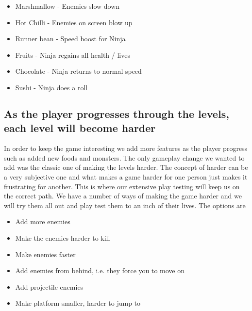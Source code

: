 \documentclass{article}
\begin{document}
\begin{itemize}
\item Marshmallow - Enemies slow down
\item Hot Chilli - Enemies on screen blow up
\item Runner bean - Speed boost for Ninja
\item Fruits - Ninja regains all health / lives
\item Chocolate - Ninja returns to normal speed
\item Sushi - Ninja does a roll
\end{itemize}

\subsection{ As the player progresses through the levels, each level will become harder }
In order to keep the game interesting we add more features as the player progress such as added new foods and monsters. 
The only gameplay change we wanted to add was the classic one of making the levels harder. The concept of harder can be a very subjective one and what makes a game harder for one person just makes it frustrating for another.
This is where our extensive play testing will keep us on the correct path. We have a number of ways of making the game harder and we will try them all out and play test them to an inch of their lives.
The options are
\begin{itemize}
\item Add more enemies
\item Make the enemies harder to kill
\item Make enemies faster
\item Add enemies from behind, i.e. they force you to move on
\item Add projectile enemies
\item Make platform smaller, harder to jump to
\end{itemize}
\end{document}
